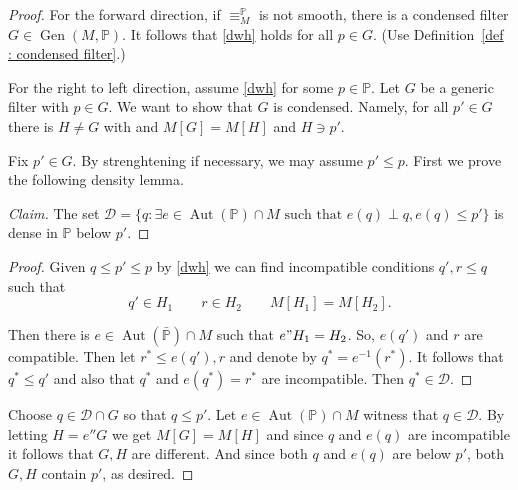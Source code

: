 \documentclass[10pt,a4paper]{amsart}
\DeclareMathOperator{\Aut}{Aut}
\newcommand{\Gen}{\operatorname{Gen}}
\begin{document}
\begin{proof}
For the forward direction,  if $\equiv_{M}^\mathbb{P}$ is not smooth, there is a condensed filter \(G\in\Gen(M,\mathbb{P})\). It follows that \eqref{dwh} holds for all $p\in G$. (Use Definition~\ref{def : condensed filter}.)

For the right to left direction,
assume \eqref{dwh} for some \(p\in\mathbb{P}\).  Let $G$ be a generic filter with $p\in G$.  We want to show that $G$ is condensed.   Namely,  for all \(p'\in G\) there is \(H\neq G\) with  and \(M[G] = M[H]\) and \(H \ni p'\).

Fix \(p'\in G\). By strenghtening if necessary, we may assume $p'\leq p$. First we prove the following density lemma.
\begin{proof}[Claim]
The set \(\mathcal{D} = \{ q : \exists e \in \Aut(\mathbb{P})\cap M\text{ such that }e(q) \perp q, e(q)\leq p' \}\) is dense in \(\mathbb{P}\) below  \(p'\).
\renewcommand{\qed}{}
\end{proof}
\begin{proof}
Given \(q\leq p' \leq p\) by \eqref{dwh} we can find incompatible conditions \(q', r\leq q\) such that
\[
q'\in H_1 \quad\quad r\in H_2 \quad\quad M[H_1] = M[H_2].
\]

Then there is \(e\in \Aut(\bar{\mathbb{P}})\cap M\) such that $e"H_1=H_2$. So, \(e(q')\) and \(r\) are compatible. Then let \(r^* \leq e(q'), r\) and denote by \(q^* = e^{-1}(r^*)\). It follows that \(q^*\leq q'\) and also that \(q^* \) and \(e(q^*)=r^*\) are incompatible. Then $q^*\in \mathcal{D}$.
\end{proof}

Choose \(q\in\mathcal{D}\cap G\) so that \(q\leq p'\).  Let \(e\in \Aut(\mathbb{P})\cap M\) witness that \(q\in\mathcal{D}\). By letting \(H = e'' G\) we get \(M[G] = M[H]\) and since \(q\) and \(e(q)\) are incompatible it follows that \(G,H\) are different. And since both \(q\) and \(e(q)\) are below $p'$, both $G,H$ contain $p'$, as desired.
\end{proof}
\end{document}
